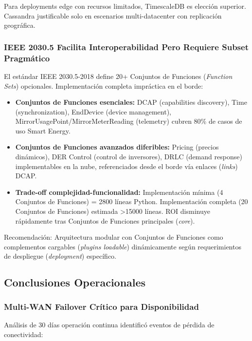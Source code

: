 Para deployments edge con recursos limitados, TimescaleDB es elección superior. Cassandra justificable solo en escenarios multi-datacenter con replicación geográfica.

\subsubsection{IEEE 2030.5 Facilita Interoperabilidad Pero Requiere Subset Pragmático}

El estándar IEEE 2030.5-2018 define 20+ Conjuntos de Funciones (\textit{Function Sets}) opcionales. Implementación completa impráctica en el borde:

\begin{itemize}
\item \textbf{Conjuntos de Funciones esenciales:} DCAP (capabilities discovery), Time (synchronization), EndDevice (device management), MirrorUsagePoint/MirrorMeterReading (telemetry) cubren 80\% de casos de uso Smart Energy.
\item \textbf{Conjuntos de Funciones avanzados diferibles:} Pricing (precios dinámicos), DER Control (control de inversores), DRLC (demand response) implementables en la nube, referenciados desde el borde vía enlaces (\textit{links}) DCAP.
\item \textbf{Trade-off complejidad-funcionalidad:} Implementación mínima (4 Conjuntos de Funciones) = 2800 líneas Python. Implementación completa (20 Conjuntos de Funciones) estimada >15000 líneas. ROI disminuye rápidamente tras Conjuntos de Funciones principales (\textit{core}).
\end{itemize}

Recomendación: Arquitectura modular con Conjuntos de Funciones como complementos cargables (\textit{plugins loadable}) dinámicamente según requerimientos de despliegue (\textit{deployment}) específico.

\subsection{Conclusiones Operacionales}

\subsubsection{Multi-WAN Failover Crítico para Disponibilidad}

Análisis de 30 días operación continua identificó eventos de pérdida de conectividad:

